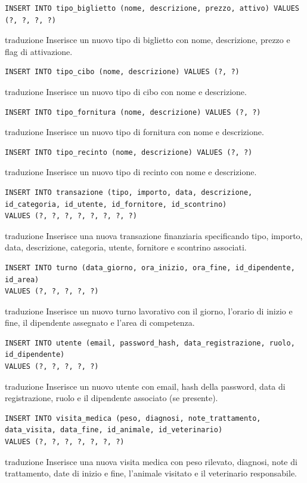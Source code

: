 \documentclass[12pt,a4paper]{report}
\begin{document}
\begin{lstlisting}[style=sqlstyle]
INSERT INTO tipo_biglietto (nome, descrizione, prezzo, attivo) VALUES (?, ?, ?, ?)
\end{lstlisting}
traduzione {Inserisce un nuovo tipo di biglietto con nome, descrizione, prezzo e flag di attivazione.}

\begin{lstlisting}[style=sqlstyle]
INSERT INTO tipo_cibo (nome, descrizione) VALUES (?, ?)
\end{lstlisting}
traduzione {Inserisce un nuovo tipo di cibo con nome e descrizione.}

\begin{lstlisting}[style=sqlstyle]
INSERT INTO tipo_fornitura (nome, descrizione) VALUES (?, ?)
\end{lstlisting}
traduzione {Inserisce un nuovo tipo di fornitura con nome e descrizione.}

\begin{lstlisting}[style=sqlstyle]
INSERT INTO tipo_recinto (nome, descrizione) VALUES (?, ?)
\end{lstlisting}
traduzione {Inserisce un nuovo tipo di recinto con nome e descrizione.}

\begin{lstlisting}[style=sqlstyle]
INSERT INTO transazione (tipo, importo, data, descrizione, id_categoria, id_utente, id_fornitore, id_scontrino)
VALUES (?, ?, ?, ?, ?, ?, ?, ?)
\end{lstlisting}
traduzione {Inserisce una nuova transazione finanziaria specificando tipo, importo, data, descrizione, categoria, utente, fornitore e scontrino associati.}

\begin{lstlisting}[style=sqlstyle]
INSERT INTO turno (data_giorno, ora_inizio, ora_fine, id_dipendente, id_area)
VALUES (?, ?, ?, ?, ?)
\end{lstlisting}
traduzione {Inserisce un nuovo turno lavorativo con il giorno, l'orario di inizio e fine, il dipendente assegnato e l'area di competenza.}

\begin{lstlisting}[style=sqlstyle]
INSERT INTO utente (email, password_hash, data_registrazione, ruolo, id_dipendente)
VALUES (?, ?, ?, ?, ?)
\end{lstlisting}
traduzione {Inserisce un nuovo utente con email, hash della password, data di registrazione, ruolo e il dipendente associato (se presente).}

\begin{lstlisting}[style=sqlstyle]
INSERT INTO visita_medica (peso, diagnosi, note_trattamento, data_visita, data_fine, id_animale, id_veterinario)
VALUES (?, ?, ?, ?, ?, ?, ?)
\end{lstlisting}
traduzione {Inserisce una nuova visita medica con peso rilevato, diagnosi, note di trattamento, date di inizio e fine, l'animale visitato e il veterinario responsabile.}
\end{document}
